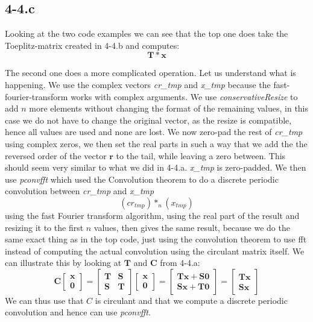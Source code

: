 \documentclass{article}
\begin{document}
\subsection*{4-4.c}
Looking at the two code examples we can see that the top one does take the Toeplitz-matrix created in 4-4.b and computes:
\begin{equation*}
    \mathbf{T} * \mathbf{x}
\end{equation*}

The second one does a more complicated operation. Let us understand what is happening. We use the complex vectors \textit{cr\_tmp} and \textit{x\_tmp} because the fast-fourier-transform works with complex arguments. We use \textit{conservativeResize} to add $n$ more elements without changing the format of the remaining values, in this case we do not have to change the original vector, as the resize is compatible, hence all values are used and none are lost. We now zero-pad the rest of \textit{cr\_tmp} using complex zeros, we then set the real parts in such a way that we add the the reversed order of the vector $\mathbf{r}$ to the tail, while leaving a zero between. This should seem very similar to what we did in 4-4.a. \textit{x\_tmp} is zero-padded. We then use \textit{pconvfft} which used the Convolution theorem to do a discrete periodic convolution between \textit{cr\_tmp} and \textit{x\_tmp}
\begin{equation*}
    \left(cr_{tmp}\right) *_{n} \left(x_{tmp}\right)
\end{equation*}
using the fast Fourier transform algorithm, using the real part of the result and resizing it to the first $n$ values, then gives the same result, because we do the same exact thing as in the top code, just using the convolution theorem to use fft instead of computing the actual convolution using the circulant matrix itself. We can illustrate this by looking at $\mathbf{T}$ and $\mathbf{C}$ from 4-4.a:
\begin{equation*}
    \mathbf{C}\begin{bmatrix}
        \mathbf{x} \\ \mathbf{0}
    \end{bmatrix} =
    \begin{bmatrix}
        \mathbf{T} & \mathbf{S} \\
        \mathbf{S} & \mathbf{T}
    \end{bmatrix}
    \begin{bmatrix}
        \mathbf{x} \\
        \mathbf{0}
    \end{bmatrix} = 
    \begin{bmatrix}
        \mathbf{Tx} + \mathbf{S0} \\
        \mathbf{Sx} + \mathbf{T0}
    \end{bmatrix} =
    \begin{bmatrix}
        \mathbf{Tx} \\
        \mathbf{Sx}
    \end{bmatrix}
\end{equation*}
We can thus use that $C$ is circulant and that we compute a discrete periodic convolution and hence can use \textit{pconvfft}.
\end{document}
